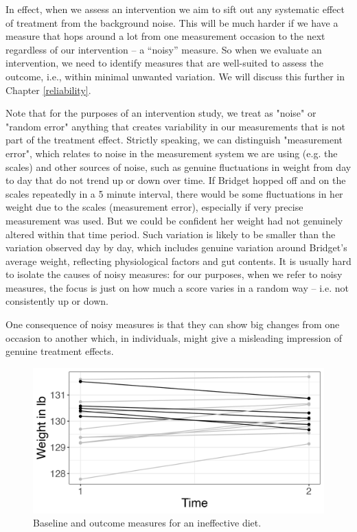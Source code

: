\documentclass{krantz}
\begin{document}
In effect, when we assess an intervention we aim to sift out any systematic effect of treatment from the background noise. This will be much harder if we have a measure that hops around a lot from one measurement occasion to the next regardless of our intervention -- a ``noisy'' measure. So when we evaluate an intervention, we need to identify measures that are well-suited to assess the outcome, i.e., within minimal unwanted variation. We will discuss this further in Chapter \ref{reliability}.

\begin{tcolorbox}[colback=Black!5!lightgray,colframe=black!75!black,coltitle=white,title=More on random error]
Note that for the purposes of an intervention study, we treat as "noise" or "random error" anything that creates variability in our measurements that is not part of the treatment effect. Strictly speaking, we can distinguish "measurement error", which relates to noise in the measurement system we are using (e.g. the scales) and other sources of noise, such as genuine fluctuations in weight from day to day that do not trend up or down over time. If Bridget hopped off and on the scales repeatedly in a 5 minute interval, there would be some fluctuations in her weight due to the scales (measurement error), especially if very precise measurement was used. But we could be confident her weight had not genuinely altered within that time period. Such variation is likely to be smaller than the variation observed day by day, which includes genuine variation around Bridget's average weight, reflecting physiological factors and gut contents. It is usually hard to isolate the causes of noisy measures: for our purposes, when we refer to noisy measures, the focus is just on how much a score varies in a random way -- i.e. not consistently up or down.
\end{tcolorbox}

One consequence of noisy measures is that they can show big changes from one occasion to another which, in individuals, might give a misleading impression of genuine treatment effects.

\begin{figure}
\includegraphics[width=0.75\linewidth]{images_bw/weightplot2} \caption{Baseline and outcome measures for an ineffective diet.}\label{fig:weightplot2}
\end{figure}
\end{document}
